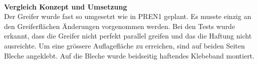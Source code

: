 \\
\textbf{Vergleich Konzept und Umsetzung}\\[0.2cm]
Der Greifer wurde fast so umgesetzt wie in PREN1 geplant. Es musste einzig an den Greiferflächen Änderungen vorgenommen werden. Bei den Tests wurde erkannt, dass die Greifer nicht perfekt parallel greifen und das die Haftung nicht ausreichte. Um eine grössere Auflagefläche zu erreichen, sind auf beiden Seiten Bleche angeklebt. Auf die Bleche wurde beidseitig haftendes Klebeband montiert.\\[0.2cm]